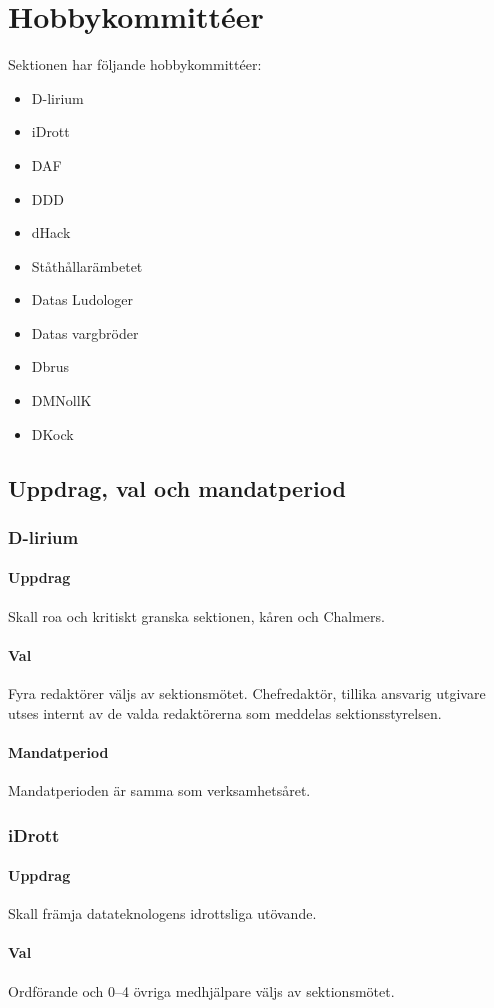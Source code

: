 \section{Hobbykommittéer}
Sektionen har följande hobbykommittéer:
\begin{itemize}
  \item D-lirium 
  \item iDrott 
  \item DAF 
  \item DDD
  \item dHack
  \item Ståthållarämbetet
  \item Datas Ludologer 
  \item Datas vargbröder
  \item Dbrus
  \item DMNollK
  \item DKock
\end{itemize}
\subsection{Uppdrag, val och mandatperiod}
\subsubsection{D-lirium}
\paragraph{Uppdrag}
Skall roa och kritiskt granska sektionen, kåren och Chalmers. 
\paragraph{Val}
Fyra redaktörer väljs av sektionsmötet. Chefredaktör, tillika ansvarig utgivare utses internt av de valda redaktörerna som meddelas sektionsstyrelsen. 
\paragraph{Mandatperiod}
Mandatperioden är samma som verksamhetsåret. 
\subsubsection{iDrott}
\paragraph{Uppdrag}
Skall främja datateknologens idrottsliga utövande. 
\paragraph{Val}
Ordförande och 0--4 övriga medhjälpare väljs av sektionsmötet. 
